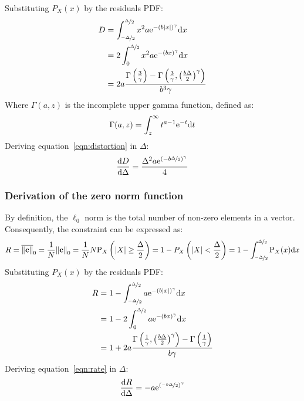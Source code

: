 \documentclass[11pt,a4paper,openright,twoside]{book}
\numberwithin{equation}{section} %
\begin{document}
Substituting $P_X(x)$ by the residuals \ac{PDF}:
\begin{align}
	D
	&=\int_{\nicefrac{-\Delta}{2}}^{\nicefrac{\Delta}{2}}
	x^2 a \text{e}^{-{\left(b\vert x \vert\right)}^\gamma} \text{d} x \\
	&=2 \int_0^{\nicefrac{\Delta}{2}}
	x^2 a \text{e}^{-{\left(b x \right)}^\gamma} \text{d} x\\
	&=
		2a \frac{\Gamma\left(\frac{3}{\gamma}\right)-
		\Gamma\left(
		\frac{3}{\gamma},{\left(\frac{b\Delta}{2}\right)}^\gamma
		\right)}{b^3\gamma}
	\label{eqn:distortion}
\end{align}
Where $\Gamma(a,z)$ is the incomplete upper gamma function, defined as:
\begin{equation}
	\Gamma(a,z)=\int_z^\infty t^{a-1}\text{e}^{-t}\text{d} t
\end{equation}
Deriving equation~\ref{eqn:distortion} in $\Delta$:
\begin{equation}
	\frac{\text{d} D}{\text{d}\Delta} =
	\frac{\Delta^2 a \text{e}^{{(-b\nicefrac{\Delta}{2})}^\gamma}}{4}
	\label{eqn:diff_distortion}
\end{equation}

\subsubsection{Derivation of the zero norm function}
\label{ssub:derivation_of_the_zero_norm_function}

By definition, the $\ell_0$ norm is the total number of non-zero
elements in a vector.
Consequently, the constraint can be expressed as:
\begin{equation}
	R 
	= \overline{\Vert \mathbf{c} \Vert}_0 = \frac{1}{N}{\Vert \mathbf{c} \Vert}_0
	= \frac{1}{N} N \text{P}_X\left(\vert X \vert \ge \frac{\Delta}{2}\right)
	= 1-P_X\left(\vert X \vert < \frac{\Delta}{2}\right)
	= 1-\int_{\nicefrac{-\Delta}{2}}^{\nicefrac{\Delta}{2}}\text{P}_X(x)\text{d} x
	\label{eqn:int_rate}
\end{equation}
Substituting $P_X(x)$ by the residuals \ac{PDF}:
\begin{align}
	R
	&=1-\int_{\nicefrac{-\Delta}{2}}^{\nicefrac{\Delta}{2}}
	a \text{e}^{-{\left(b\vert x \vert\right)}^\gamma} \text{d} x \\
	&=1-2\int_0^{\nicefrac{\Delta}{2}}
	a \text{e}^{-{\left(b x \right)}^\gamma} \text{d} x \\
	&=1+2a\frac{\Gamma\left(
		\frac{1}{\gamma},{\left(\frac{b\Delta}{2}\right)}^\gamma\right)-
		\Gamma\left(\frac{1}{\gamma}\right)}
		{b\gamma}
	\label{eqn:rate}
\end{align}
Deriving equation~\ref{eqn:rate} in $\Delta$:
\begin{equation}
	\frac{\text{d} R}{\text{d}\Delta} =
	-a\text{e}^{{\left(\nicefrac{-b\Delta}{2}\right)}^\gamma}
	\label{eqn:diff_rate}
\end{equation}
\end{document}
